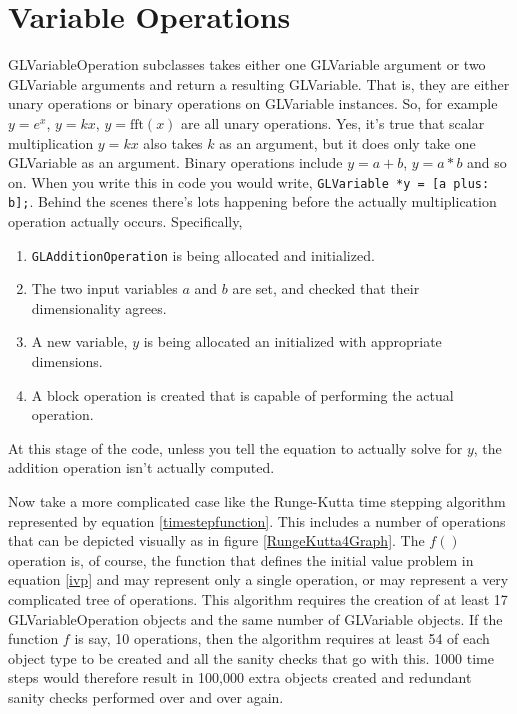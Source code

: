 \documentclass[11pt]{article}
\begin{document}
\section{Variable Operations}

GLVariableOperation subclasses takes either one GLVariable argument or two GLVariable arguments and return a resulting GLVariable. That is, they are either unary operations or binary operations on GLVariable instances. So, for example $y=e^x$, $y=k x$, $y=\textrm{fft}(x)$ are all unary operations. Yes, it's true that scalar multiplication $y=k x$ also takes $k$ as an argument, but it does only take one GLVariable as an argument. Binary operations include $y=a+b$, $y=a*b$ and so on. When you write this in code you would write,
\texttt{GLVariable *y = [a plus: b];}.
Behind the scenes there's lots happening before the actually multiplication operation actually occurs. Specifically,
\begin{enumerate}
\item \texttt{GLAdditionOperation} is being allocated and initialized.
\item The two input variables $a$ and $b$ are set, and checked that their dimensionality agrees.
\item A new variable, $y$ is being allocated an initialized with appropriate dimensions.
\item A block operation is created that is capable of performing the actual operation.
\end{enumerate}
At this stage of the code, unless you tell the equation to actually solve for $y$, the addition operation isn't actually computed. 

Now take a more complicated case like the Runge-Kutta time stepping algorithm represented by equation \ref{timestepfunction}. This includes a number of operations that can be depicted visually as in figure \ref{RungeKutta4Graph}. The $f()$ operation is, of course, the function that defines the initial value problem in equation \ref{ivp} and may represent only a single operation, or may represent a very complicated tree of operations. This algorithm requires the creation of at least 17 GLVariableOperation objects and the same number of GLVariable objects. If the function $f$ is say, 10 operations, then the algorithm requires at least 54 of each object type to be created and all the sanity checks that go with this. 1000 time steps would therefore result in 100,000 extra objects created and redundant sanity checks performed over and over again.
\end{document}
